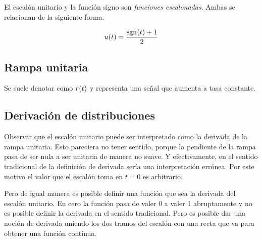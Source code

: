 \begin{center}
    \def\svgwidth{0.6\linewidth}
    
\end{center}

El escalón unitario y la función signo son \emph{funciones escalonadas}.
Ambas se relacionan de la siguiente forma.

\begin{mdframed}[style=PropertyFrame]
    \begin{prop}
    \end{prop}
    \begin{equation*}
        \fx[u]{t} = \frac{\fx[\sgn]{t} + 1}{2}
    \end{equation*}
\end{mdframed}

\subsection{Rampa unitaria}

Se suele denotar como $\fx[r]{t}$ y representa una señal que aumenta a tasa constante.

\begin{center}
    \def\svgwidth{0.6\linewidth}
    
\end{center}

\subsection{Derivación de distribuciones}

Observar que el escalón unitario puede ser interpretado como la derivada de la rampa unitaria.
Esto pareciera no tener sentido, porque la pendiente de la rampa pasa de ser nula a ser unitaria de manera no suave.
Y efectivamente, en el sentido tradicional de la definición de derivada sería una interpretación errónea.
Por este motivo el valor que el escalón toma en $t=0$ es arbitrario.

Pero de igual manera es posible definir una función que sea la derivada del escalón unitario.
En cero la función pasa de valer 0 a valer 1 abruptamente y no es posible definir la derivada en el sentido tradicional.
Pero es posible dar una noción de derivada uniendo los dos tramos del escalón con una recta que va  para obtener una función continua.

\begin{center}
    \def\svgwidth{0.6\linewidth}
    
\end{center}


